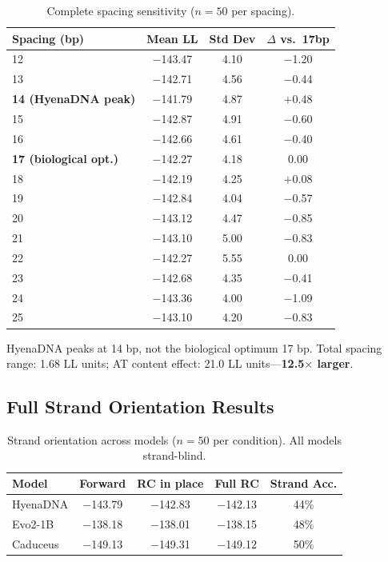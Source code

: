\documentclass{article}
\begin{document}
\begin{table}[ht]
\caption{Complete spacing sensitivity ($n=50$ per spacing).}
\label{tab:full_spacing}
\centering\small
\begin{tabular}{lccc}
\toprule
Spacing (bp) & Mean LL & Std Dev & $\Delta$ vs.\ 17bp \\
\midrule
12 & $-$143.47 & 4.10 & $-$1.20 \\
13 & $-$142.71 & 4.56 & $-$0.44 \\
\textbf{14 (HyenaDNA peak)} & $-$141.79 & 4.87 & $+$0.48 \\
15 & $-$142.87 & 4.91 & $-$0.60 \\
16 & $-$142.66 & 4.61 & $-$0.40 \\
\textbf{17 (biological opt.)} & $-$142.27 & 4.18 & 0.00 \\
18 & $-$142.19 & 4.25 & $+$0.08 \\
19 & $-$142.84 & 4.04 & $-$0.57 \\
20 & $-$143.12 & 4.47 & $-$0.85 \\
21 & $-$143.10 & 5.00 & $-$0.83 \\
22 & $-$142.27 & 5.55 & 0.00 \\
23 & $-$142.68 & 4.35 & $-$0.41 \\
24 & $-$143.36 & 4.00 & $-$1.09 \\
25 & $-$143.10 & 4.20 & $-$0.83 \\
\bottomrule
\end{tabular}
\end{table}

HyenaDNA peaks at 14 bp, not the biological optimum 17 bp. Total spacing range: 1.68 LL
units; AT content effect: 21.0 LL units---\textbf{12.5$\times$ larger}.

\subsection{Full Strand Orientation Results}

\begin{table}[ht]
\caption{Strand orientation across models ($n=50$ per condition). All models strand-blind.}
\label{tab:strand_all_models}
\centering\small
\begin{tabular}{lcccc}
\toprule
Model & Forward & RC in place & Full RC & Strand Acc. \\
\midrule
HyenaDNA & $-$143.79 & $-$142.83 & $-$142.13 & 44\% \\
Evo2-1B  & $-$138.18 & $-$138.01 & $-$138.15 & 48\% \\
Caduceus & $-$149.13 & $-$149.31 & $-$149.12 & 50\% \\
\bottomrule
\end{tabular}
\end{table}
\end{document}
